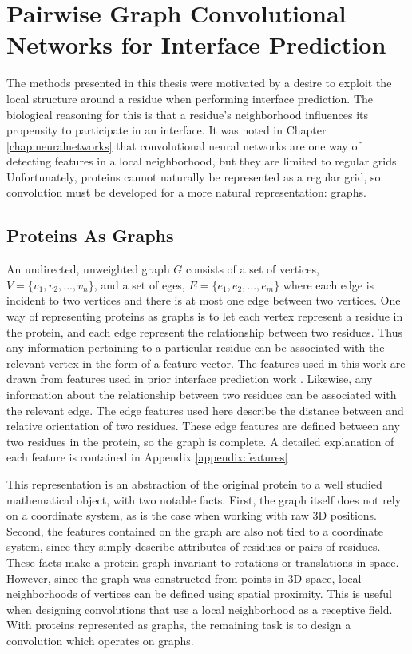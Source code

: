 \chapter{Pairwise Graph Convolutional Networks for Interface Prediction}
\label{chap:methods}

The methods presented in this thesis were motivated by a desire to exploit the local structure around a residue when performing interface prediction.
The biological reasoning for this is that a residue's neighborhood influences its propensity to participate in an interface.
It was noted in Chapter \ref{chap:neuralnetworks} that convolutional neural networks are one way of detecting features in a local neighborhood, but they are limited to regular grids. 
Unfortunately, proteins cannot naturally be represented as a regular grid, so convolution must be developed for a more natural representation: graphs.


\section{Proteins As Graphs}

An undirected, unweighted graph $G$ consists of a set of vertices, $V=\{v_1, v_2, ..., v_n\}$, and a set of eges, $E=\{e_1, e_2, ..., e_m\}$ where each edge is incident to two vertices and there is at most one edge between two vertices.
One way of representing proteins as graphs is to let each vertex represent a residue in the protein, and each edge represent the relationship between two residues.
Thus any information pertaining to a particular residue can be associated with the relevant vertex in the form of a feature vector.
The features used in this work are drawn from features used in prior interface prediction work \cite{minhas2014}.
Likewise, any information about the relationship between two residues can be associated with the relevant edge.
The edge features used here describe the distance between and relative orientation of two residues.
These edge features are defined between any two residues in the protein, so the graph is complete. 
A detailed explanation of each feature is contained in Appendix \ref{appendix:features}

This representation is an abstraction of the original protein to a well studied mathematical object, with two notable facts.
First, the graph itself does not rely on a coordinate system, as is the case when working with raw 3D positions.
Second, the features contained on the graph are also not tied to a coordinate system, since they simply describe attributes of residues or pairs of residues.
These facts make a protein graph invariant to rotations or translations in space. 
However, since the graph was constructed from points in 3D space, local neighborhoods of vertices can be defined using spatial proximity.
This is useful when designing convolutions that use a local neighborhood as a receptive field.
With proteins represented as graphs, the remaining task is to design a convolution which operates on graphs. 

